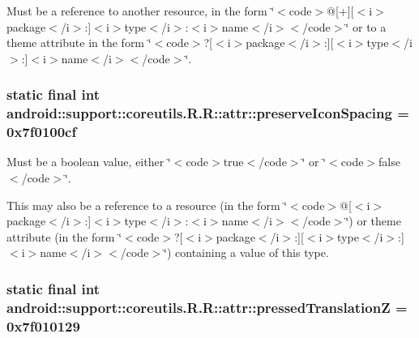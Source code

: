 Must be a reference to another resource, in the form \char`\"{}$<$code$>$@\mbox{[}+\mbox{]}\mbox{[}$<$i$>$package$<$/i$>$:\mbox{]}$<$i$>$type$<$/i$>$:$<$i$>$name$<$/i$>$$<$/code$>$\char`\"{} or to a theme attribute in the form \char`\"{}$<$code$>$?\mbox{[}$<$i$>$package$<$/i$>$:\mbox{]}\mbox{[}$<$i$>$type$<$/i$>$:\mbox{]}$<$i$>$name$<$/i$>$$<$/code$>$\char`\"{}. \hypertarget{classandroid_1_1support_1_1coreutils_1_1_r_1_1attr_9c06cb95721f2016e98e2d1f3ecd06e7}{
\subsubsection[{preserveIconSpacing}]{\setlength{\rightskip}{0pt plus 5cm}static final int android::support::coreutils.R.R::attr::preserveIconSpacing = 0x7f0100cf}}
\label{classandroid_1_1support_1_1coreutils_1_1_r_1_1attr_9c06cb95721f2016e98e2d1f3ecd06e7}


Must be a boolean value, either \char`\"{}$<$code$>$true$<$/code$>$\char`\"{} or \char`\"{}$<$code$>$false$<$/code$>$\char`\"{}. 

This may also be a reference to a resource (in the form \char`\"{}$<$code$>$@\mbox{[}$<$i$>$package$<$/i$>$:\mbox{]}$<$i$>$type$<$/i$>$:$<$i$>$name$<$/i$>$$<$/code$>$\char`\"{}) or theme attribute (in the form \char`\"{}$<$code$>$?\mbox{[}$<$i$>$package$<$/i$>$:\mbox{]}\mbox{[}$<$i$>$type$<$/i$>$:\mbox{]}$<$i$>$name$<$/i$>$$<$/code$>$\char`\"{}) containing a value of this type. \hypertarget{classandroid_1_1support_1_1coreutils_1_1_r_1_1attr_a448c5d0b628ccf8f565e5d06d97826e}{
\subsubsection[{pressedTranslationZ}]{\setlength{\rightskip}{0pt plus 5cm}static final int android::support::coreutils.R.R::attr::pressedTranslationZ = 0x7f010129}}
\label{classandroid_1_1support_1_1coreutils_1_1_r_1_1attr_a448c5d0b628ccf8f565e5d06d97826e}


